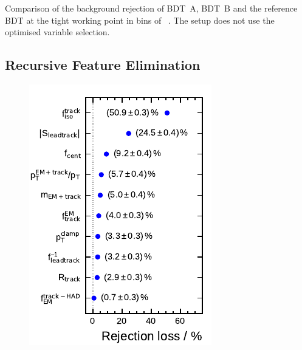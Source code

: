 \begin{minipage}{\textwidth}
\begin{subfigure}[t]{0.48\textwidth}
  \end{subfigure}
  \caption[Background rejection of BDT~A, BDT~B and the reference BDT at the
  tight working point]{Comparison of the background rejection of BDT~A, BDT~B
    and the reference BDT at the tight working point in bins of \tauhadvis~\pt.
    The setup does not use the optimised variable selection.}
\end{minipage}

\FloatBarrier
\subsection{Recursive Feature Elimination}
\noindent
\begin{minipage}{\textwidth}
  \captionsetup{type=figure}
  \centering
  \begin{subfigure}[t]{0.33\textwidth}
    \centering
    \includegraphics{./figures/bdt_perf/var_importance/1p_iter1.pdf}
  \end{subfigure}
  \begin{subfigure}[t]{0.33\textwidth}
    \centering

\end{subfigure}
\end{minipage}
